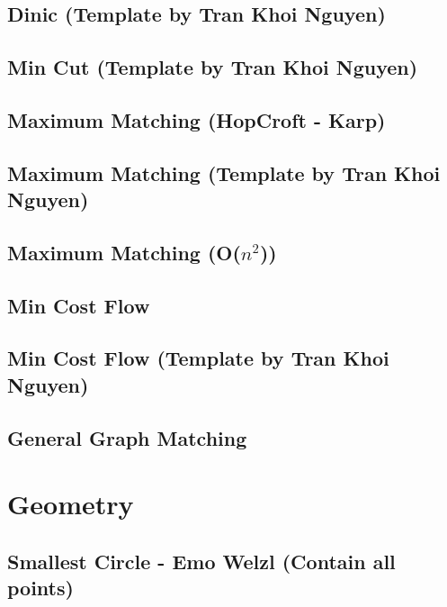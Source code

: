 \subsection{Dinic (Template by Tran Khoi Nguyen)}
\raggedbottom
\hrulefill
\subsection{Min Cut (Template by Tran Khoi Nguyen)}
\raggedbottom
\hrulefill
\subsection{Maximum Matching (HopCroft - Karp)}
\raggedbottom
\hrulefill
\subsection{Maximum Matching (Template by Tran Khoi Nguyen)}
\raggedbottom
\hrulefill
\subsection{Maximum Matching (O($n^2$))}
\raggedbottom
\hrulefill
\subsection{Min Cost Flow}
\raggedbottom
\hrulefill
\subsection{Min Cost Flow (Template by Tran Khoi Nguyen)}
\raggedbottom
\hrulefill
\subsection{General Graph Matching}
\raggedbottom
\hrulefill

\section{Geometry}
\subsection{Smallest Circle - Emo Welzl (Contain all points)}
\raggedbottom
\hrulefill
